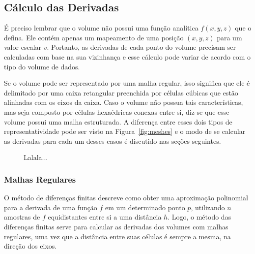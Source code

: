 \subsection{Cálculo das Derivadas}
	É preciso lembrar que o volume não possui uma função analítica $ f(x, y, z) $ que o defina. Ele contém apenas um mapeamento de uma posição $ (x, y, z) $ para um valor escalar $ v $. Portanto, as derivadas de cada ponto do volume precisam ser calculadas com base na sua vizinhança e esse cálculo pode variar de acordo com o tipo do volume de dados.
	
	Se o volume pode ser representado por uma malha regular, isso significa que ele é delimitado por uma caixa retangular preenchida por células cúbicas que estão alinhadas com os eixos da caixa. Caso o volume não possua tais características, mas seja composto por células hexaédricas conexas entre si, diz-se que esse volume possui uma malha estruturada. A diferença entre esses dois tipos de representatividade pode ser visto na Figura~\ref{fig:meshes} e o modo de se calcular as derivadas para cada um desses casos é discutido nas seções seguintes.
	
\begin{figure}[h]
	\centering
	\hspace{10mm}
	\caption{Lalala...}
\end{figure}
    
\subsubsection{Malhas Regulares}
\label{subsec:my.struct}
	O método de diferenças finitas descreve como obter uma aproximação polinomial para a derivada de uma função $ f $ em um determinado ponto $ p $, utilizando $ n $ amostras de $ f $ equidistantes entre si a uma distância $ h $. Logo, o método das diferenças finitas serve para calcular as derivadas dos volumes com malhas regulares, uma vez que a distância entre suas células é sempre a mesma, na direção dos eixos.
	
